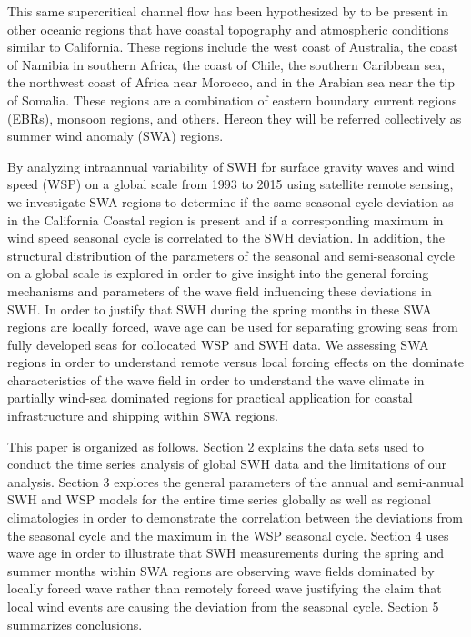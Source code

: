 \documentclass[12pt,twoside]{article}
\begin{document}
This same supercritical channel flow has been hypothesized by \citet{winant1988marine} to be present in other oceanic regions that have coastal topography and atmospheric conditions similar to California. These regions include the west coast of Australia, the coast of Namibia in southern Africa, the coast of Chile, the southern Caribbean sea, the northwest coast of Africa near Morocco, and in the Arabian sea near the tip of Somalia. These regions are a combination of eastern boundary current regions (EBRs), monsoon regions, and others. Hereon they will be referred collectively as summer wind anomaly (SWA) regions. 

By analyzing intraannual variability of SWH for surface gravity waves and wind speed (WSP) on a global scale from 1993 to 2015 using satellite remote sensing, we investigate SWA regions to determine if the same seasonal cycle deviation as in the California Coastal region is present and if a corresponding maximum in wind speed seasonal cycle is correlated to the SWH deviation. In addition, the structural distribution of the parameters of the seasonal and semi-seasonal cycle on a global scale is explored in order to give insight into the general forcing mechanisms and parameters of the wave field influencing these deviations in SWH\@. In order to justify that SWH during the spring months in these SWA regions are locally forced, wave age can be used for separating growing seas from fully developed seas for collocated WSP and SWH data. We assessing SWA regions in order to understand remote versus local forcing effects on the dominate characteristics of the wave field in order to understand the wave climate in partially wind-sea dominated regions for practical application for coastal infrastructure and shipping within SWA regions.

This paper is organized as follows. Section 2 explains the data sets used to conduct the time series analysis of global SWH data and the limitations of our analysis. Section 3 explores the general parameters of the annual and semi-annual SWH and WSP models for the entire time series globally as well as regional climatologies in order to demonstrate the correlation between the deviations from the seasonal cycle and the maximum in the WSP seasonal cycle. Section 4 uses wave age in order to illustrate that SWH measurements during the spring and summer months within SWA regions are observing wave fields dominated by locally forced wave rather than remotely forced wave justifying the claim that local wind events are causing the deviation from the seasonal cycle. Section 5 summarizes conclusions.
\end{document}

